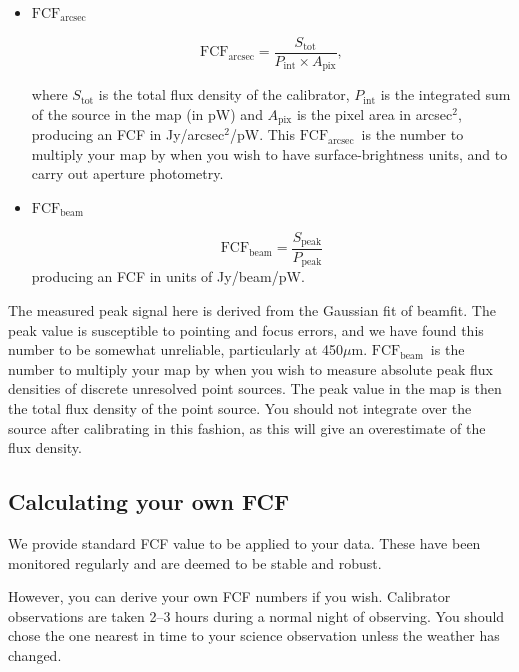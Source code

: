 \documentclass[twoside,11pt]{article}
\newcommand{\xref}[3]{#1}
\newcommand{\xlabel}[1]{}
\renewcommand{\_}{\texttt{\symbol{95}}}
\newcommand{\micron}{\mbox{$\mu$m}}
\newcommand{\fcfb}{$\mathrm{FCF_{beam}}$}
\newcommand{\fcfa}{$\mathrm{FCF_{arcsec}}$}
\newcommand{\task}[1]{\textsf{#1}}
\newcommand{\beamfit}{\xref{\task{beamfit}}{sun95}{BEAMFIT}}
\begin{document}
\begin{itemize}

\item{\textbf{\fcfa}}

\begin{equation}
\label{eq:fcf_arcsec}
\mathrm{FCF_{arcsec}} = \frac{S_\mathrm{tot}}{P_\mathrm{int} \times
  A_\mathrm{pix}},
\end{equation}

where $S_\mathrm{tot}$ is the total flux density of the calibrator,
$P_\mathrm{int}$ is the integrated sum of the source in the map (in
pW) and $A_\mathrm{pix}$ is the pixel area in arcsec$^2$, producing an
FCF in Jy/arcsec$^2$/pW. This \fcfa\ is the number to
multiply your map by when you wish to have surface-brightness units,
and to carry out aperture photometry.

\item{\textbf{\fcfb}}

\begin{equation}
\label{eq:fcf_beam}
\mathrm{FCF_{beam}} = \frac{S_\mathrm{{peak}}}{P_\mathrm{peak}}
\end{equation}
producing an FCF in units of Jy/beam/pW.
\end{itemize}

The measured peak signal here is derived from the Gaussian fit of
\beamfit. The peak value is susceptible to pointing and focus errors,
and we have found this number to be somewhat unreliable, particularly
at 450\micron. \fcfb\ is the number to multiply your
map by when you wish to measure absolute peak flux densities of
discrete unresolved point sources. The peak value in the map is then
the total flux density of the point source. You should not integrate
over the source after calibrating in this fashion, as this will give
an overestimate of the flux density.


\subsection{\xlabel{ownfcf}Calculating your own FCF}

We provide standard FCF value to be applied to your data. These have
been monitored regularly and are deemed to be stable and robust.

However, you can derive your own FCF numbers if you wish. Calibrator
observations are taken 2--3 hours during a normal night of observing.
You should chose the one nearest in time to your science observation
unless the weather has changed.
\end{document}
